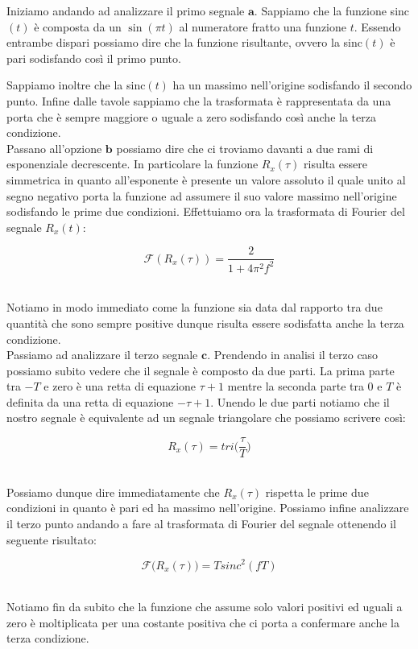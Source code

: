 \documentclass[../main.tex]{subfiles}
\begin{document}
Iniziamo andando ad analizzare il primo segnale $\textbf{a}$.
Sappiamo che la funzione sinc$(t)$ è composta da un $\sin(\pi t)$ al numeratore fratto una funzione $t$. Essendo entrambe dispari possiamo dire che la funzione risultante, ovvero la sinc$(t)$ è pari sodisfando così il primo punto.

Sappiamo inoltre che la sinc$(t)$ ha un massimo nell'origine sodisfando il secondo punto.
Infine dalle tavole sappiamo che la trasformata è rappresentata da una porta che è sempre maggiore o uguale a zero sodisfando così anche la terza condizione.\\

Passano all'opzione $\textbf{b}$ possiamo dire che ci troviamo davanti a due rami di esponenziale decrescente.
In particolare la funzione $R_x(\tau)$ risulta essere simmetrica in quanto all'esponente è presente un valore assoluto il quale unito al segno negativo porta la funzione ad assumere il suo valore massimo nell'origine sodisfando le prime due condizioni.
Effettuiamo ora la trasformata di Fourier del segnale $R_x(t)$:

\[ \mathcal{F}(R_x(\tau)) = \frac{2}{1 + 4\pi^2 f^2}  \]\ 

Notiamo in modo immediato come la funzione sia data dal rapporto tra due quantità che sono sempre positive dunque risulta essere sodisfatta anche la terza condizione.\\

Passiamo ad analizzare il terzo segnale $\textbf{c}$. 
Prendendo in analisi il terzo caso possiamo subito vedere che il segnale è composto da due parti.
La prima parte tra $-T$ e zero è una retta di equazione $\tau + 1$ mentre la seconda parte tra 0 e $T$ è definita da una retta di equazione $-\tau + 1$. Unendo le due parti notiamo che il nostro segnale è equivalente ad un segnale triangolare che possiamo scrivere così:

\[ R_x(\tau) = \unit{tri}\bigg( \frac{\tau}{T}\bigg) \]\

Possiamo dunque dire immediatamente che $R_x(\tau)$ rispetta le prime due condizioni in quanto è pari ed ha massimo nell'origine.
Possiamo infine analizzare il terzo punto andando a fare al trasformata di Fourier del segnale ottenendo il seguente risultato:

\[ \mathcal{F}\big(R_x(\tau)\big) = T \unit{sinc}^2(fT) \]\

Notiamo fin da subito che la funzione che assume solo valori positivi ed uguali a zero è moltiplicata per una costante positiva che ci porta a confermare anche la terza condizione.
\end{document}
